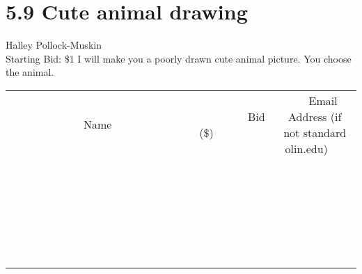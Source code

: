 \documentclass[11pt]{article}
\begin{document}
\section*{5.9 Cute animal drawing}
Halley Pollock-Muskin
\\
Starting Bid: \$1
\newline
I will make you a poorly drawn cute animal picture. You choose the animal.
\\[6ex]
\begin{tabular}{c c c}
~~~~~~~~~~~~~Name~~~~~~~~~~~~~ & ~~~~~~~~~Bid (\$)~~~~~~~~~  & ~~~Email Address (if not standard olin.edu)~~~\\
 & & \\
\hline
 & & \\
\hline
 & & \\
\hline
 & & \\
\hline
 & & \\
\hline
 & & \\
\hline
 & & \\
\hline
 & & \\
\hline
 & & \\
\hline
 & & \\
\hline
 & & \\
\hline
 & & \\
\hline
 & & \\
\hline
 & & \\
\hline
 & & \\
\hline
 & & \\
\hline
 & & \\
\hline
 & & \\
\hline
 & & \\
\hline
 & & \\
\hline
 & & \\
\hline
 & & \\
\hline
 & & \\
\hline
 & & \\
\hline
 & & \\
\hline
 & & \\
\hline
\end{tabular}
\newpage
\end{document}
